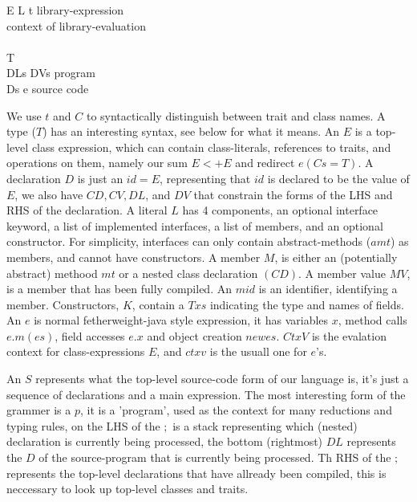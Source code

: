 \begin{bnf}
{E}      {L \mmid{} t \mmid{}  \mmid{} }           {library-expression}\\  {context of library-evaluation}\\           {}\\      { T}                                                 {}\\      {DLs\Q{;} DVs}                                                     {program}\\      {Ds e}                                                             {source code}
\end{bnf}

We use $t$ and $C$ to syntactically distinguish between trait and class names. A type ($T$) has an interesting syntax, see below for what it means.
An $E$ is a top-level class expression, which can contain class-literals, references to traits, and operations on them, namely our sum $E <+ E$ and redirect $e(Cs=T)$.
A declaration $D$ is just an $id = E$, representing that $id$ is declared to be the value of $E$, we also have $CD, CV, DL$, and $DV$ that constrain the forms of the LHS and RHS of the declaration.
A literal $L$ has 4 components, an optional interface keyword, a list of implemented interfaces, a list of members, and an optional constructor. For simplicity, interfaces can only contain abstract-methods ($amt$) as members, and cannot have  constructors. A member $M$, is either an (potentially abstract) methood $mt$ or a nested class declaration $(CD)$. A member value $MV$, is a member that has been fully compiled. An $mid$ is an identifier, identifying a member.
Constructors, $K$, contain a $Txs$ indicating the type and names of fields. An $e$ is normal fetherweight-java style expression, it has variables $x$, method calls $e.m(es)$, field accesses $e.x$ and object creation $new es$.
$CtxV$ is the evalation context for class-expressions $E$, and $ctxv$ is the usuall one for $e$’s.

An $S$ represents what the top-level source-code form of our language is, it’s just a sequence of declarations and a main expression.
The most interesting form of the grammer is a $p$, it is a ’program’, used as the context for many reductions and typing rules, on the LHS of the $;$ is a stack representing which (nested) declaration is currently being processed, the bottom (rightmost) $DL$ represents the $D$ of the source-program that is currently being processed. Th RHS of the $;$ represents the top-level declarations that have allready been compiled, this is neccessary to look up top-level classes and traits.

